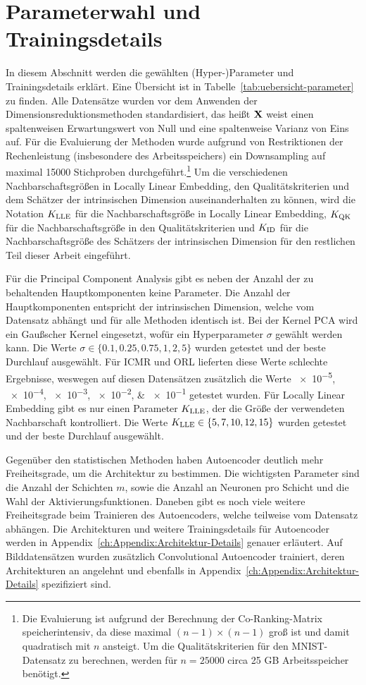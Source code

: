 \section{Parameterwahl und Trainingsdetails}
\label{ch:Vergleich:sec:ParameterwahlTrainingsdetails}

In diesem Abschnitt werden die gewählten (Hyper-)Parameter und Trainingsdetails erklärt. Eine
Übersicht ist in Tabelle~\ref{tab:uebersicht-parameter} zu finden. Alle Datensätze wurden vor dem
Anwenden der Dimensionsreduktionsmethoden standardisiert, das heißt $\mathbf{X}$ weist einen
spaltenweisen Erwartungswert von Null und eine spaltenweise Varianz von Eins auf. Für die
Evaluierung der Methoden wurde aufgrund von Restriktionen der Rechenleistung (insbesondere des
Arbeitsspeichers) ein Downsampling auf maximal \num{15000} Stichproben durchgeführt.\footnote{Die
	Evaluierung ist aufgrund der Berechnung der Co-Ranking-Matrix speicherintensiv, da diese maximal
	$(n-1) \times (n-1)$ groß ist und damit quadratisch mit $n$ ansteigt. Um die Qualitätskriterien für
	den MNIST-Datensatz zu berechnen, werden für $n=\num{25000}$ circa 25 GB Arbeitsspeicher benötigt.}
Um die verschiedenen Nachbarschaftsgrößen in Locally Linear Embedding, den Qualitätskriterien und
dem Schätzer der intrinsischen Dimension auseinanderhalten zu können, wird die Notation $K_{\text{LLE}}$ für
die Nachbarschaftsgröße in Locally Linear Embedding, $K_{\text{QK}}$ für die Nachbarschaftsgröße in den
Qualitätskriterien und $K_{\text{ID}}$ für die Nachbarschaftsgröße des Schätzers der intrinsischen Dimension
für den restlichen Teil dieser Arbeit eingeführt.

Für die Principal Component Analysis gibt es neben der Anzahl der zu behaltenden Hauptkomponenten
keine Parameter. Die Anzahl der Hauptkomponenten entspricht der intrinsischen Dimension, welche vom
Datensatz abhängt und für alle Methoden identisch ist. Bei der Kernel PCA wird ein Gaußscher Kernel
eingesetzt, wofür ein Hyperparameter $\sigma$ gewählt werden kann. Die Werte $\sigma \in \{ 0.1,
	0.25, 0.75, 1, 2, 5\}$ wurden getestet und der beste Durchlauf ausgewählt. Für ICMR und ORL
lieferten diese Werte schlechte Ergebnisse, weswegen auf diesen Datensätzen zusätzlich die Werte
\numlist{e-5;e-4;e-3;e-2;e-1} getestet wurden. Für Locally Linear Embedding gibt es nur einen
Parameter $K_{\text{LLE}}$, der die Größe der verwendeten Nachbarschaft kontrolliert. Die Werte $K_{\text{LLE}} \in
	\{ 5, 7, 10, 12, 15\}$ wurden getestet und der beste Durchlauf ausgewählt.

Gegenüber den statistischen Methoden haben Autoencoder deutlich mehr Freiheitsgrade, um die
Architektur zu bestimmen. Die wichtigsten Parameter sind die Anzahl der Schichten $m$, sowie die
Anzahl an Neuronen pro Schicht und die Wahl der Aktivierungsfunktionen. Daneben gibt es noch viele
weitere Freiheitsgrade beim Trainieren des Autoencoders, welche teilweise vom Datensatz abhängen.
Die Architekturen und weitere Trainingsdetails für Autoencoder werden in
Appendix~\ref{ch:Appendix:Architektur-Details} genauer erläutert. Auf Bilddatensätzen wurden
zusätzlich Convolutional Autoencoder trainiert, deren Architekturen an \textcite[14]{Ghosh.2019}
angelehnt und ebenfalls in Appendix~\ref{ch:Appendix:Architektur-Details} spezifiziert sind.

